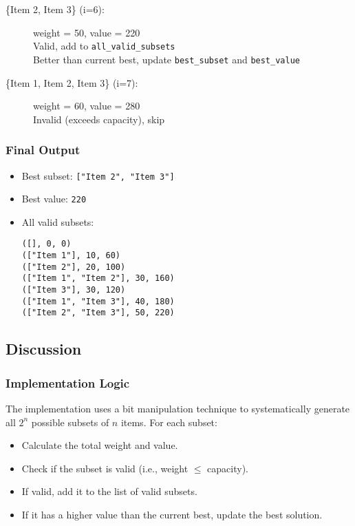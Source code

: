 \documentclass{article}
\begin{document}
\begin{itemize}
\begin{description}
        \item[\{Item 2, Item 3\} (i=6):] weight = 50, value = 220 \\
        Valid, add to \texttt{all\_valid\_subsets} \\
        Better than current best, update \texttt{best\_subset} and \texttt{best\_value}
        
        \item[\{Item 1, Item 2, Item 3\} (i=7):] weight = 60, value = 280 \\
        Invalid (exceeds capacity), skip
    \end{description}
\end{itemize}

\subsubsection*{Final Output}
\begin{itemize}
    \item Best subset: \texttt{["Item 2", "Item 3"]}
    \item Best value: \texttt{220}
    \item All valid subsets:
    \begin{verbatim}
([], 0, 0)
(["Item 1"], 10, 60)
(["Item 2"], 20, 100)
(["Item 1", "Item 2"], 30, 160)
(["Item 3"], 30, 120)
(["Item 1", "Item 3"], 40, 180)
(["Item 2", "Item 3"], 50, 220)
    \end{verbatim}
\end{itemize}

\subsection*{Discussion}
\subsubsection*{Implementation Logic}
The implementation uses a bit manipulation technique to systematically generate all $2^n$ possible subsets of $n$ items. For each subset:
\begin{itemize}
    \item Calculate the total weight and value.
    \item Check if the subset is valid (i.e., weight $\leq$ capacity).
    \item If valid, add it to the list of valid subsets.
    \item If it has a higher value than the current best, update the best solution.
\end{itemize}
\end{document}
